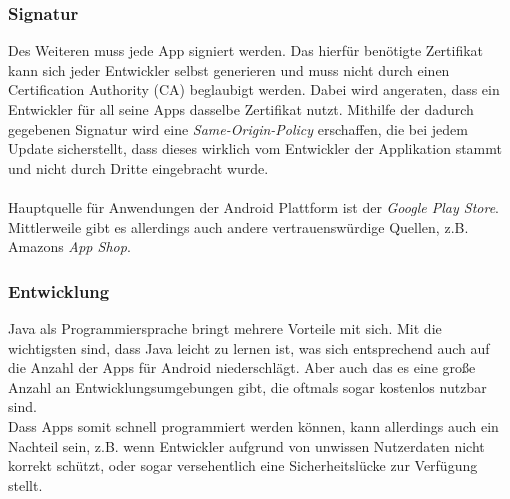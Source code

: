 	\subsubsection{Signatur}
	Des Weiteren muss jede App signiert werden. Das hierfür benötigte Zertifikat kann sich jeder Entwickler selbst generieren und muss nicht durch einen Certification Authority (CA) beglaubigt werden. Dabei wird angeraten, dass ein Entwickler für all seine Apps dasselbe Zertifikat nutzt. Mithilfe der dadurch gegebenen Signatur wird eine \textit{Same-Origin-Policy} erschaffen, die bei jedem Update sicherstellt, dass dieses wirklich vom Entwickler der Applikation stammt und nicht durch Dritte eingebracht wurde.\\\\
	Hauptquelle für Anwendungen der Android Plattform ist der \textit{Google Play Store}. Mittlerweile gibt es allerdings auch andere vertrauenswürdige Quellen, z.B. Amazons \textit{App Shop}.
	
	\subsubsection{Entwicklung}
	Java als Programmiersprache bringt mehrere Vorteile mit sich. Mit die wichtigsten sind, dass Java leicht zu lernen ist, was sich entsprechend auch auf die Anzahl der Apps für Android niederschlägt. Aber auch das es eine große Anzahl an Entwicklungsumgebungen gibt, die oftmals sogar kostenlos nutzbar sind.\\
	Dass Apps somit schnell programmiert werden können, kann allerdings auch ein Nachteil sein, z.B. wenn Entwickler aufgrund von unwissen Nutzerdaten nicht korrekt schützt, oder sogar versehentlich eine Sicherheitslücke zur Verfügung stellt.